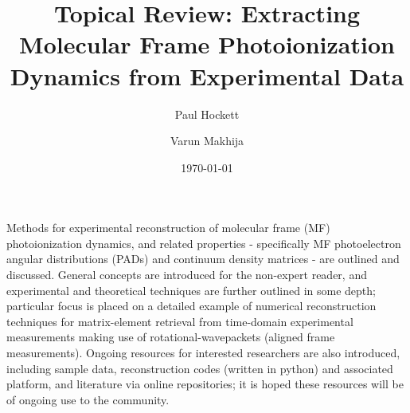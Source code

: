 \documentclass[10pt]{article}
\renewenvironment{abstract}
  {{\bfseries\noindent{\abstractname}\par\nobreak}\footnotesize}
  {\bigskip}
\begin{document}
\title{Topical Review: Extracting Molecular Frame Photoionization Dynamics from
Experimental Data}



\author[1]{Paul Hockett}%
\author[2]{Varun Makhija}%
%
%


\vspace{-1em}



  \date{\today}


\begingroup
\let\center\flushleft
\let\endcenter\endflushleft
\maketitle
\endgroup





\begin{abstract}
Methods for experimental reconstruction of molecular frame (MF)
photoionization dynamics, and related properties - specifically MF
photoelectron angular distributions (PADs) and continuum density
matrices - are outlined and discussed. General concepts are introduced
for the non-expert reader, and experimental and theoretical techniques
are further outlined in some depth; particular focus is placed on a
detailed example of numerical reconstruction techniques for
matrix-element retrieval from time-domain experimental measurements
making use of rotational-wavepackets (aligned frame measurements).
Ongoing resources for interested researchers are also introduced,
including sample data, reconstruction codes (written in python) and
associated platform, and literature via online repositories; it is hoped
these resources will be of ongoing use to the community.%
\end{abstract}%



\sloppy




\end{document}
